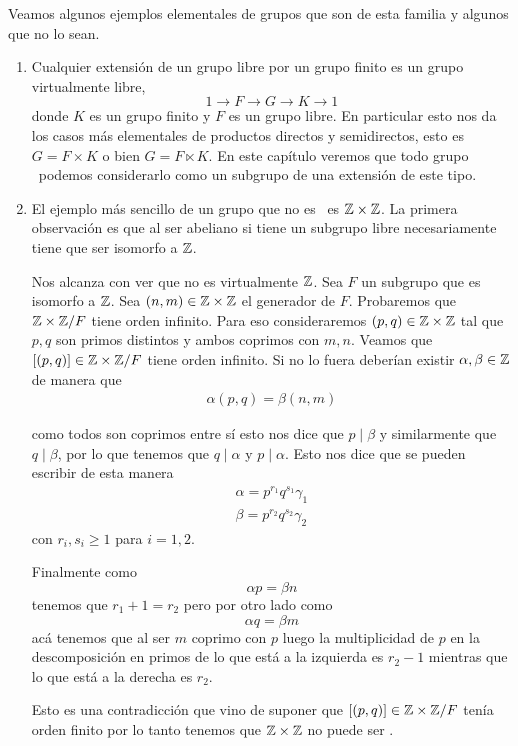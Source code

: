 \documentclass[tesis.tex]{subfiles}
\begin{document}
\begin{ej}
Veamos algunos ejemplos elementales de grupos que son de esta familia y algunos que no lo sean.
\begin{enumerate}	
	\item Cualquier extensión de un grupo libre por un grupo finito es un grupo virtualmente libre,
	\[
		1 \to F \to G \to K \to 1
	\]
	donde $K$ es un grupo finito y $F$ es un grupo \fg libre.
	En particular esto nos da los casos más elementales de productos directos y semidirectos, esto es $G= F \times K$ o bien  $G = F \ltimes K$.
	En este capítulo veremos que todo grupo \vl \ podemos considerarlo como un subgrupo de una extensión de este tipo.
	
	\item El ejemplo más sencillo de un grupo que no es \vl \ es $\mathbb{Z} \times \mathbb{Z}$.
	La primera observación es que al ser abeliano si tiene un subgrupo libre necesariamente tiene que ser isomorfo a $\mathbb{Z}$.
	
	Nos alcanza con ver que no es virtualmente $\mathbb{Z}$.
	Sea $F$ un subgrupo que es isomorfo a $\mathbb{Z}$.
	Sea $(n,m) \in \mathbb{Z} \times \mathbb{Z}$ el generador de $F$.
	Probaremos que $\mathbb{Z} \times \mathbb{Z} / F$ tiene orden infinito.
	Para eso consideraremos $(p,q) \in \mathbb{Z} \times \mathbb{Z}$	tal que $p,q$ son primos distintos y ambos coprimos con $m,n$.
	Veamos que $[(p,q)] \in \mathbb{Z} \times \mathbb{Z} / F$ tiene orden infinito.
	Si no lo fuera deberían existir $\alpha, \beta \in \mathbb{Z}$ de manera que 
	\begin{align*}
		\alpha (p,q) = \beta(n,m) 
	\end{align*}
	
	como todos son coprimos entre sí esto nos dice que $p \mid \beta$ y similarmente que $q \mid \beta$, por lo que tenemos que $q \mid \alpha$ y $p \mid \alpha$.
	Esto nos dice que se pueden escribir de esta manera
	\begin{align*}
		\alpha = p^{r_1} q^{s_1} \gamma_1 \\
		\beta = p^{r_2} q^{s_2} \gamma_2
	\end{align*}
	con $r_i, s_i \ge 1$ para $i=1,2$.

	Finalmente como 
	\[ 
		\alpha p = \beta n
	\]
	tenemos que $r_1+ 1 = r_2$ pero por otro lado como
	\[
		\alpha q  = \beta m
	\]
	acá tenemos que al ser $m$ coprimo con $p$ luego la multiplicidad de $p$ en la descomposición en primos de lo que está a la izquierda es $r_2 - 1 $ mientras que lo que está a la derecha es $r_2$.
	
	Esto es una contradicción que vino de suponer que $[(p,q)] \in \mathbb{Z} \times \mathbb{Z} / F$ tenía orden finito por lo tanto tenemos que $\mathbb{Z} \times \mathbb{Z}$ no puede ser \vl.
	
\end{enumerate}
\end{ej}
\end{document}
